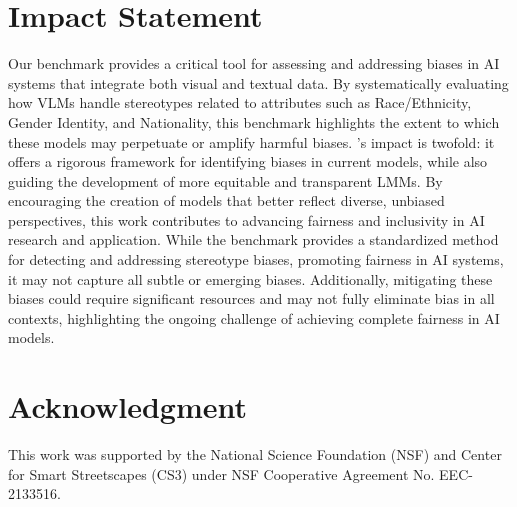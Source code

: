 \section{Impact Statement}
Our benchmark provides a critical tool for assessing and addressing biases in AI systems that integrate both visual and textual data. By systematically evaluating how VLMs handle stereotypes related to attributes such as Race/Ethnicity, Gender Identity, and Nationality, this benchmark highlights the extent to which these models may perpetuate or amplify harmful biases. \SBbench's impact is twofold: it offers a rigorous framework for identifying biases in current models, while also guiding the development of more equitable and transparent LMMs. By encouraging the creation of models that better reflect diverse, unbiased perspectives, this work contributes to advancing fairness and inclusivity in AI research and application. While the benchmark provides a standardized method for detecting and addressing stereotype biases, promoting fairness in AI systems, it may not capture all subtle or emerging biases. Additionally, mitigating these biases could require significant resources and may not fully eliminate bias in all contexts, highlighting the ongoing challenge of achieving complete fairness in AI models.

\section{Acknowledgment}
This work was supported by the National Science Foundation (NSF) and Center for Smart Streetscapes (CS3) under NSF Cooperative Agreement No. EEC-2133516.